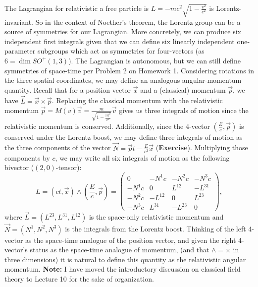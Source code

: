 \documentclass{article}
\newcommand{\nl}{\newline\newline\noindent}
\begin{document}
The Lagrangian for relativistic a free particle is $L = -mc^2\sqrt{1-\frac{v^2}{c^2}}$ is Lorentz-invariant. So in the context of Noether's theorem, the Lorentz group can be a source of symmetries for our Lagrangian. More concretely, we can produce six independent first integrals given that we can define six linearly independent one-parameter subgroups which act as symmetries for four-vectors (as $6 = \dim SO^+(1,3)$). The Lagrangian is autonomous, but we can still define symmetries of space-time per Problem 2 on Homework 1. Considering rotations in the three spatial coordinates, we may define an analogous angular-momentum quantity. Recall that for a position vector $\vec x$ and a (classical) momentum $\vec p$, we have $\vec L = \vec x\times \vec p$. Replacing the classical momentum with the relativistic momentum $\vec p = M(v)\vec v = \frac{m}{\sqrt{1-\frac{|v|^2}{c^2}}}\vec v$ gives us three integrals of motion since the relativistic momentum is conserved. Additionally, since the 4-vector $\left(\frac{E}{c}, \vec p\right)$ is conserved under the Lorentz boost, we may define three integrals of motion as the three components of the vector $\vec N = \vec p t - \frac{E}{c^2}\vec x$ (\textbf{Exercise}). Multiplying those components by $c$, we may write all six integrals of motion as the following bivector ($(2,0)$-tensor):
\[L = (ct,\vec x)\wedge \left(\frac{E}{c},\vec p\right) = \left(\begin{array}{c|ccc}
     0 & -N^1c & -N^2c & -N^3c \\
     \hline
     -N^1c & 0 & L^{12} & -L^{31}\\
     -N^2c & -L^{12} & 0 & L^{23}\\
     -N^3c & L^{31} & -L^{23} & 0
\end{array}\right),\]
where $\vec L = (L^{23},L^{31},L^{12})$ is the space-only relativistic momentum and $\vec N = (N^1,N^2,N^3)$ is the integrals from the Lorentz boost. Thinking of the left 4-vector as the space-time analogue of the position vector, and given the right 4-vector's status as the space-time analogue of momentum, (and that $\wedge = \times$ in three dimensions) it is natural to define this quantity as the relativistic angular momentum.
\nl
\textbf{Note:} I have moved the introductory discussion on classical field theory to Lecture 10 for the sake of organization.
\end{document}
